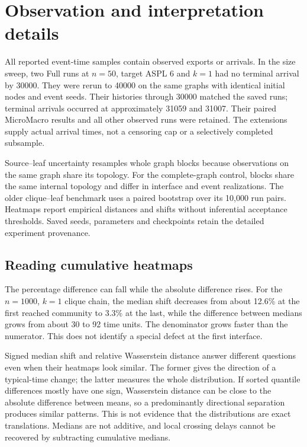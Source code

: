 \documentclass[a4paper,fleqn]{cas-sc}
\begin{document}
\clearpage
\appendix


\section{Observation and interpretation details}
\label{app:reproducibility}

All reported event-time samples contain observed exports or arrivals. In the size sweep, two Full runs at $n=50$, target ASPL 6 and $k=1$ had no terminal arrival by 30000. They were rerun to 40000 on the same graphs with identical initial nodes and event seeds. Their histories through 30000 matched the saved runs; terminal arrivals occurred at approximately 31059 and 31007. Their paired MicroMacro results and all other observed runs were retained. The extensions supply actual arrival times, not a censoring cap or a selectively completed subsample.

Source--leaf uncertainty resamples whole graph blocks because observations on the same graph share its topology. For the complete-graph control, blocks share the same internal topology and differ in interface and event realizations. The older clique--leaf benchmark uses a paired bootstrap over its 10,000 run pairs. Heatmaps report empirical distances and shifts without inferential acceptance thresholds. Saved seeds, parameters and checkpoints retain the detailed experiment provenance.

\subsection{Reading cumulative heatmaps}
\label{app:heatmap_interpretation}

The percentage difference can fall while the absolute difference rises. For the $n=1000$, $k=1$ clique chain, the median shift decreases from about 12.6\% at the first reached community to 3.3\% at the last, while the difference between medians grows from about 30 to 92 time units. The denominator grows faster than the numerator. This does not identify a special defect at the first interface.

Signed median shift and relative Wasserstein distance answer different questions even when their heatmaps look similar. The former gives the direction of a typical-time change; the latter measures the whole distribution. If sorted quantile differences mostly have one sign, Wasserstein distance can be close to the absolute difference between means, so a predominantly directional separation produces similar patterns. This is not evidence that the distributions are exact translations. Medians are not additive, and local crossing delays cannot be recovered by subtracting cumulative medians.



\end{document}
